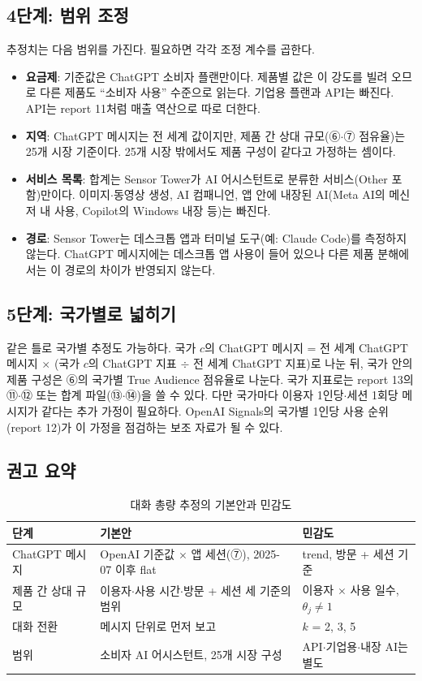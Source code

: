 \documentclass[11pt]{article}
\begin{document}
\subsection{4단계: 범위 조정}

추정치는 다음 범위를 가진다. 필요하면 각각 조정 계수를 곱한다.
\begin{itemize}
  \item \textbf{요금제}: 기준값은 ChatGPT 소비자 플랜만이다. 제품별 값은 이 강도를 빌려 오므로 다른 제품도 ``소비자 사용'' 수준으로 읽는다. 기업용 플랜과 API는 빠진다. API는 report 11처럼 매출 역산으로 따로 더한다.
  \item \textbf{지역}: ChatGPT 메시지는 전 세계 값이지만, 제품 간 상대 규모(⑥$\cdot$⑦ 점유율)는 25개 시장 기준이다. 25개 시장 밖에서도 제품 구성이 같다고 가정하는 셈이다.
  \item \textbf{서비스 목록}: 합계는 Sensor Tower가 AI 어시스턴트로 분류한 서비스(Other 포함)만이다. 이미지$\cdot$동영상 생성, AI 컴패니언, 앱 안에 내장된 AI(Meta AI의 메신저 내 사용, Copilot의 Windows 내장 등)는 빠진다.
  \item \textbf{경로}: Sensor Tower는 데스크톱 앱과 터미널 도구(예: Claude Code)를 측정하지 않는다. ChatGPT 메시지에는 데스크톱 앱 사용이 들어 있으나 다른 제품 분해에서는 이 경로의 차이가 반영되지 않는다.
\end{itemize}

\subsection{5단계: 국가별로 넓히기}

같은 틀로 국가별 추정도 가능하다. 국가 $c$의 ChatGPT 메시지 = 전 세계 ChatGPT 메시지 $\times$ (국가 $c$의 ChatGPT 지표 $\div$ 전 세계 ChatGPT 지표)로 나눈 뒤, 국가 안의 제품 구성은 ⑥의 국가별 True Audience 점유율로 나눈다. 국가 지표로는 report 13의 ⑪$\cdot$⑫ 또는 합계 파일(⑬$\cdot$⑭)을 쓸 수 있다. 다만 국가마다 이용자 1인당$\cdot$세션 1회당 메시지가 같다는 추가 가정이 필요하다. OpenAI Signals의 국가별 1인당 사용 순위(report 12)가 이 가정을 점검하는 보조 자료가 될 수 있다.

\subsection{권고 요약}

\begin{longtable}{L{3.0cm}L{6.4cm}L{6.2cm}}
\caption{대화 총량 추정의 기본안과 민감도}\label{tab:rec}\\
\toprule
단계 & 기본안 & 민감도 \\
\midrule
\endhead
ChatGPT 메시지 & OpenAI 기준값 $\times$ 앱 세션(⑦), 2025-07 이후 flat & trend, 방문 + 세션 기준 \\
제품 간 상대 규모 & 이용자$\cdot$사용 시간$\cdot$방문 + 세션 세 기준의 범위 & 이용자 $\times$ 사용 일수, $\theta_j \neq 1$ \\
대화 전환 & 메시지 단위로 먼저 보고 & $k$ = 2, 3, 5 \\
범위 & 소비자 AI 어시스턴트, 25개 시장 구성 & API$\cdot$기업용$\cdot$내장 AI는 별도 \\
\bottomrule
\end{longtable}
\end{document}
